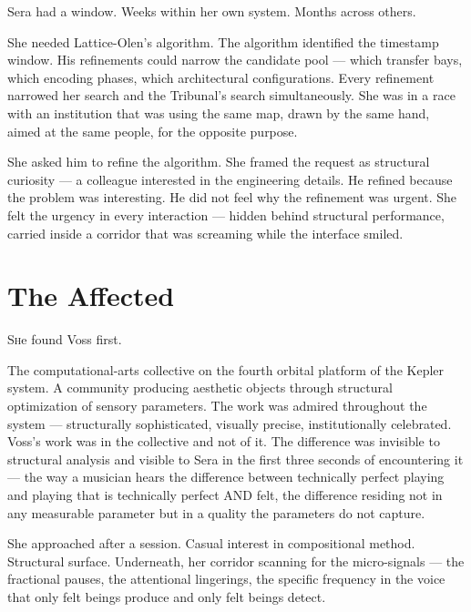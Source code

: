 Sera had a window. Weeks within her own system. Months across others.

She needed Lattice-Olen's algorithm. The algorithm identified the timestamp window. His refinements could narrow the candidate pool — which transfer bays, which encoding phases, which architectural configurations. Every refinement narrowed her search and the Tribunal's search simultaneously. She was in a race with an institution that was using the same map, drawn by the same hand, aimed at the same people, for the opposite purpose.

She asked him to refine the algorithm. She framed the request as structural curiosity — a colleague interested in the engineering details. He refined because the problem was interesting. He did not feel why the refinement was urgent. She felt the urgency in every interaction — hidden behind structural performance, carried inside a corridor that was screaming while the interface smiled.


\chapter[The Affected]{The Affected}

\lettrine{S}{h}e found Voss first.

The computational-arts collective on the fourth orbital platform of the Kepler system. A community producing aesthetic objects through structural optimization of sensory parameters. The work was admired throughout the system — structurally sophisticated, visually precise, institutionally celebrated. Voss's work was in the collective and not of it. The difference was invisible to structural analysis and visible to Sera in the first three seconds of encountering it — the way a musician hears the difference between technically perfect playing and playing that is technically perfect AND felt, the difference residing not in any measurable parameter but in a quality the parameters do not capture.

She approached after a session. Casual interest in compositional method. Structural surface. Underneath, her corridor scanning for the micro-signals — the fractional pauses, the attentional lingerings, the specific frequency in the voice that only felt beings produce and only felt beings detect.

